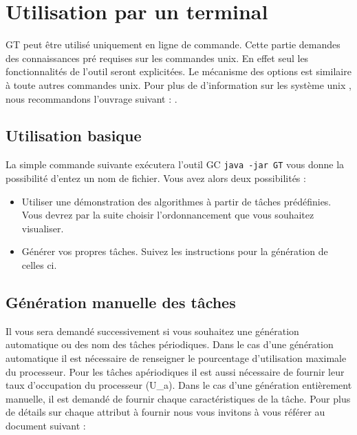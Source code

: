 \section{Utilisation par un terminal}
\label{chap:useterm}

\renewcommand{\labelitemi}{$\bullet$} %

GT peut être utilisé uniquement en ligne de commande. Cette partie demandes des connaissances pré requises sur les commandes unix. En effet seul les fonctionnalités de l'outil seront explicitées. Le mécanisme des options est similaire à toute autres commandes unix. Pour plus de d'information sur les système \gls{unix}
, nous recommandons l'ouvrage suivant : \cite{linux}.


\subsection{Utilisation basique}
\label{sec:usebas}
La simple commande suivante exécutera l'outil GC \verb+java -jar GT+  vous donne la possibilité d'entez un nom de fichier. Vous avez alors deux possibilités : 
\begin{itemize}
\item
Utiliser une démonstration des algorithmes à partir de tâches prédéfinies. Vous devrez par la suite choisir l'ordonnancement que vous souhaitez visualiser. 
\item
Générer vos propres tâches. Suivez les instructions pour la génération de celles ci.
\end{itemize}


\subsection{Génération manuelle des tâches}
Il vous sera demandé successivement si vous souhaitez une génération automatique ou des nom des tâches périodiques. Dans le cas d'une génération automatique il est nécessaire de renseigner le pourcentage d'utilisation maximale du processeur. Pour les tâches apériodiques il est aussi nécessaire de fournir leur taux d'occupation du processeur (U\_a).
Dans le cas d'une génération entièrement manuelle, il est demandé de fournir chaque caractéristiques de la tâche. Pour plus de détails sur chaque attribut à fournir nous vous invitons à vous référer au document suivant : \cite{SD}
 
